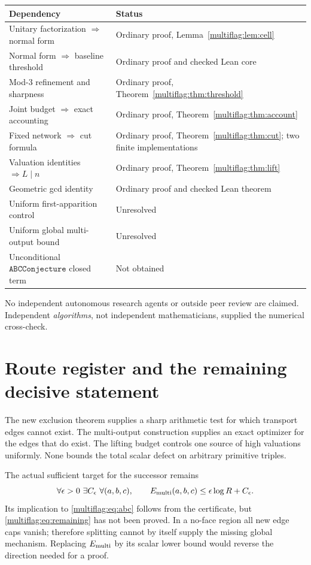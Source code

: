 \begin{center}\small
\begin{tabular}{p{64mm}p{84mm}}\toprule
Dependency & Status\\\midrule
Unitary factorization \(\Rightarrow\) normal form & Ordinary proof, Lemma~\ref{multiflag:lem:cell}\\
Normal form \(\Rightarrow\) baseline threshold & Ordinary proof and checked Lean core\\
Mod-3 refinement and sharpness & Ordinary proof, Theorem~\ref{multiflag:thm:threshold}\\
Joint budget \(\Rightarrow\) exact accounting & Ordinary proof, Theorem~\ref{multiflag:thm:account}\\
Fixed network \(\Rightarrow\) cut formula & Ordinary proof, Theorem~\ref{multiflag:thm:cut}; two finite implementations\\
Valuation identities \(\Rightarrow L\mid n\) & Ordinary proof, Theorem~\ref{multiflag:thm:lift}\\
Geometric gcd identity & Ordinary proof and checked Lean theorem\\
Uniform first-apparition control & Unresolved\\
Uniform global multi-output bound & Unresolved\\
Unconditional \(\mathtt{ABCConjecture}\) closed term & Not obtained\\\bottomrule
\end{tabular}
\end{center}
No independent autonomous research agents or outside peer review are claimed. Independent \emph{algorithms}, not independent mathematicians, supplied the numerical cross-check.

\section{Route register and the remaining decisive statement}
The new exclusion theorem supplies a sharp arithmetic test for which transport edges cannot exist. The multi-output construction supplies an exact optimizer for the edges that do exist. The lifting budget controls one source of high valuations uniformly. None bounds the total scalar defect on arbitrary primitive triples.

The actual sufficient target for the successor remains
\begin{equation}\label{multiflag:eq:remaining}
 \forall\epsilon>0\ \exists C_\epsilon\ \forall(a,b,c),\qquad
 E_{\rm multi}(a,b,c)\le\epsilon\log R+C_\epsilon.
\end{equation}
Its implication to \eqref{multiflag:eq:abc} follows from the certificate, but \eqref{multiflag:eq:remaining} has not been proved. In a no-face region all new edge caps vanish; therefore splitting cannot by itself supply the missing global mechanism. Replacing \(E_{\rm multi}\) by its scalar lower bound would reverse the direction needed for a proof.

